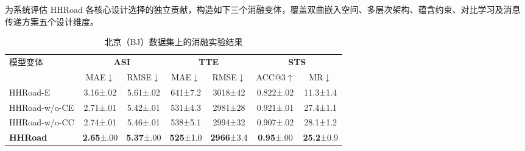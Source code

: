 为系统评估 HHRoad 各核心设计选择的独立贡献，构造如下三个消融变体，覆盖双曲嵌入空间、多层次架构、蕴含约束、对比学习及消息传递方案五个设计维度。


\begin{table}[H]
    \centering
    \caption{北京（BJ）数据集上的消融实验结果}
    \label{tab:ablation_bj}
    \setlength{\tabcolsep}{4pt}
    \renewcommand{\arraystretch}{1.2}
    \begin{tabular}{lcccccc}
        \toprule
        \multirow{2}{*}{模型变体}
            & \multicolumn{2}{c}{\textbf{ASI}}
            & \multicolumn{2}{c}{\textbf{TTE}}
            & \multicolumn{2}{c}{\textbf{STS}} \\
        \cmidrule(lr){2-3} \cmidrule(lr){4-5} \cmidrule(lr){6-7}
            & MAE$\downarrow$ & RMSE$\downarrow$
            & MAE$\downarrow$ & RMSE$\downarrow$
            & ACC@3$\uparrow$ & MR$\downarrow$ \\
        \midrule
        HHRoad-E
            & 3.16\tiny{±.02} & 5.61\tiny{±.02}
            & 641\tiny{±7.2}  & 3018\tiny{±42}
            & 0.822\tiny{±.02} & 11.3\tiny{±1.4} \\
        HHRoad-w/o-CE
            & 2.71\tiny{±.01} & 5.42\tiny{±.01}
            & 531\tiny{±4.3}  & 2981\tiny{±28}
            & 0.921\tiny{±.01} & 27.4\tiny{±1.1} \\
        HHRoad-w/o-CC
            & 2.74\tiny{±.01} & 5.46\tiny{±.01}
            & 538\tiny{±5.1}  & 2994\tiny{±32}
            & 0.907\tiny{±.02} & 28.1\tiny{±1.2} \\
        \textbf{HHRoad}
            & \textbf{2.65}\tiny{±.00} & \textbf{5.37}\tiny{±.00}
            & \textbf{525}\tiny{±1.0}  & \textbf{2966}\tiny{±3.4}
            & \textbf{0.95}\tiny{±.00}  & \textbf{25.2}\tiny{±0.9} \\
        \bottomrule
    \end{tabular}
\end{table}

